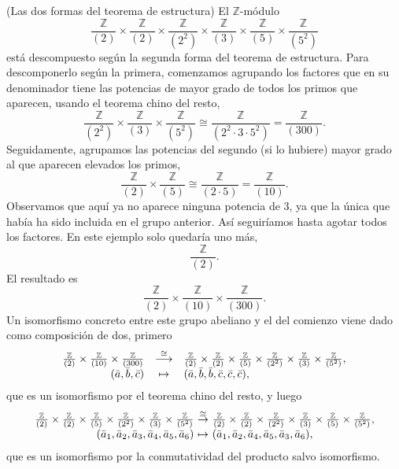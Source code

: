 \textrm{\normalfont (Las dos formas del teorema de estructura)}
El \(\mathbb{Z}\)-módulo
\[\frac{\mathbb{Z}}{(2)}\times \frac{\mathbb{Z}}{(2)}\times \frac{\mathbb{Z}}{(2^2)}\times \frac{\mathbb{Z}}{(3)}\times \frac{\mathbb{Z}}{(5)}\times\frac{\mathbb{Z}}{(5^2)}\]
está descompuesto según la segunda forma del teorema de estructura. Para
descomponerlo según la primera, comenzamos agrupando los factores que en
su denominador tiene las potencias de mayor grado de todos los primos
que aparecen, usando el teorema chino del resto,
\[ \frac{\mathbb{Z}}{(2^2)}\times \frac{\mathbb{Z}}{(3)}\times\frac{\mathbb{Z}}{(5^2)}\cong 
\frac{\mathbb{Z}}{(2^2\cdot 3\cdot 5^2)}=\frac{\mathbb{Z}}{(300)}.\]
Seguidamente, agrupamos las potencias del segundo (si lo hubiere) mayor
grado al que aparecen elevados los primos,
\[\frac{\mathbb{Z}}{(2)}\times \frac{\mathbb{Z}}{(5)}\cong \frac{\mathbb{Z}}{(2\cdot 5)}=\frac{\mathbb{Z}}{(10)}.\]
Observamos que aquí ya no aparece ninguna potencia de 3, ya que la única
que había ha sido incluida en el grupo anterior. Así seguiríamos hasta
agotar todos los factores. En este ejemplo solo quedaría uno más,
\[\frac{\mathbb{Z}}{(2)}.\] El resultado es
\[\frac{\mathbb{Z}}{(2)}\times \frac{\mathbb{Z}}{(10)}\times \frac{\mathbb{Z}}{(300)}.\]
Un isomorfismo concreto entre este grupo abeliano y el del comienzo
viene dado como composición de dos, primero \[
\begin{array}{rcl}
\frac{\mathbb{Z}}{(2)}\times \frac{\mathbb{Z}}{(10)}\times \frac{\mathbb{Z}}{(300)}&\stackrel{\cong}\longrightarrow&
\frac{\mathbb{Z}}{(2)}\times \frac{\mathbb{Z}}{(2)}\times \frac{\mathbb{Z}}{(5)}\times \frac{\mathbb{Z}}{(2^2)}\times \frac{\mathbb{Z}}{(3)}\times \frac{\mathbb{Z}}{(5^2)},\cr
(\bar a,\bar b, \bar c)&\mapsto&
(\bar a,\bar b,\bar b, \bar c, \bar c, \bar c),
\end{array}
\] que es un isomorfismo por el teorema chino del resto, y luego \[
\begin{array}{rcl}
\frac{\mathbb{Z}}{(2)}\times \frac{\mathbb{Z}}{(2)}\times \frac{\mathbb{Z}}{(5)}\times \frac{\mathbb{Z}}{(2^2)}\times \frac{\mathbb{Z}}{(3)}\times \frac{\mathbb{Z}}{(5^2)}
&\!\!\!\!\stackrel{\cong}\rightarrow\!\!\!\!&
\frac{\mathbb{Z}}{(2)}\times \frac{\mathbb{Z}}{(2)}\times \frac{\mathbb{Z}}{(2^2)}\times \frac{\mathbb{Z}}{(3)}\times \frac{\mathbb{Z}}{(5)}\times\frac{\mathbb{Z}}{(5^2)},\cr
(\bar{a}_1,\bar{a}_2,\bar{a}_3,\bar{a}_4,\bar{a}_5,\bar{a}_6)&\!\!\!\!\mapsto\!\!\!\!&
(\bar{a}_1,\bar{a}_2,\bar{a}_4,\bar{a}_5,\bar{a}_3,\bar{a}_6),
\end{array}
\] que es un isomorfismo por la conmutatividad del producto salvo
isomorfismo. 

